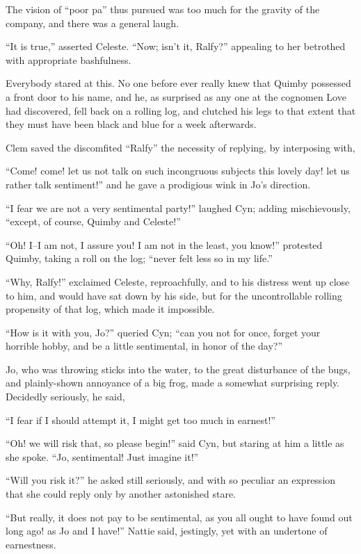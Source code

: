 The vision of ``poor pa'' thus pursued was too much for the gravity of
the company, and there was a general laugh.

``It is true,'' asserted Celeste. ``Now; isn't it, Ralfy?'' appealing to her
betrothed with appropriate bashfulness.

Everybody stared at this. No one before ever really knew that Quimby
possessed a front door to his name, and he, as surprised as any one at
the cognomen Love had discovered, fell back on a rolling log, and
clutched his legs to that extent that they must have been black and blue
for a week afterwards.

Clem saved the discomfited ``Ralfy'' the necessity of replying, by
interposing with,

``Come! come! let us not talk on such incongruous subjects this lovely
day! let us rather talk sentiment!'' and he gave a prodigious wink in
Jo's direction.

``I fear we are not a very sentimental party!'' laughed Cyn; adding
mischievously, ``except, of course, Quimby and Celeste!''

``Oh! I--I am not, I assure you! I am not in the least, you know!''
protested Quimby, taking a roll on the log; ``never felt less so in my
life.''

``Why, Ralfy!'' exclaimed Celeste, reproachfully, and to his distress went
up close to him, and would have sat down by his side, but for the
uncontrollable rolling propensity of that log, which made it impossible.

``How is it with you, Jo?'' queried Cyn; ``can you not for once, forget
your horrible hobby, and be a little sentimental, in honor of the day?''

Jo, who was throwing sticks into the water, to the great disturbance of
the bugs, and plainly-shown annoyance of a big frog, made a somewhat
surprising reply. Decidedly seriously, he said,

``I fear if I should attempt it, I might get too much in earnest!''

``Oh! we will risk that, so please begin!'' said Cyn, but staring at him a
little as she spoke. ``Jo, sentimental! Just imagine it!''

``Will you risk it?'' he asked still seriously, and with so peculiar an
expression that she could reply only by another astonished stare.

``But really, it does not pay to be sentimental, as you all ought to have
found out long ago! as Jo and I have!'' Nattie said, jestingly, yet with
an undertone of earnestness.


